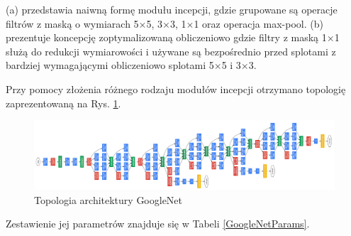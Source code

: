 (a) przedstawia naiwną formę modułu incepcji, gdzie grupowane są operacje filtrów z maską o wymiarach 5$\times$5, 3$\times$3, 1$\times$1 oraz operacja max-pool. (b) prezentuje koncepcję zoptymalizowaną obliczeniowo gdzie filtry z maską 1$\times$1 służą do redukcji wymiarowości i używane są bezpośrednio przed splotami z bardziej wymagającymi obliczeniowo splotami 5$\times$5 i 3$\times$3. 

Przy pomocy złożenia różnego rodzaju modułów incepcji otrzymano topologię zaprezentowaną na Rys. \ref{GoogleNetTopo}.
\begin{figure}[h!]
	\centering
	\includegraphics[width=1\textwidth]{figures/GoogleNet.png}
	\caption{Topologia architektury GoogleNet}
	\label{GoogleNetTopo}
\end{figure}
Zestawienie jej parametrów znajduje się w Tabeli \ref{GoogleNetParams}.
\renewcommand{\arraystretch}{1.2}

